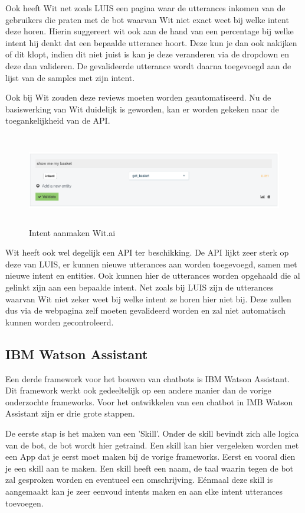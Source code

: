 Ook heeft Wit net zoals LUIS een pagina waar de utterances inkomen van de gebruikers die praten met de bot waarvan Wit niet exact weet bij welke intent deze horen. Hierin suggereert wit ook aan de hand van een percentage bij welke intent hij denkt dat een bepaalde utterance hoort. Deze kun je dan ook nakijken of dit klopt, indien dit niet juist is kan je deze veranderen via de dropdown en deze dan valideren. De gevalideerde utterance wordt daarna toegevoegd aan de lijst van de samples met zijn intent.

Ook bij Wit zouden deze reviews moeten worden geautomatiseerd. Nu de basiswerking van Wit duidelijk is geworden, kan er worden gekeken naar de toegankelijkheid van de API. 

\begin{figure}[h!]
	\centering
	\includegraphics[height=4cm]{img/inbox.png}
	\caption{Intent aanmaken Wit.ai}
	\label{fig:inbox}
\end{figure}

Wit heeft ook wel degelijk een API ter beschikking. De API lijkt zeer sterk op deze van LUIS, er kunnen nieuwe utterances aan worden toegevoegd, samen met nieuwe intent en entities. Ook kunnen hier de utterances worden opgehaald die al gelinkt zijn aan een bepaalde intent. Net zoals bij LUIS zijn de utterances waarvan Wit niet zeker weet bij welke intent ze horen hier niet bij. Deze zullen dus via de webpagina zelf moeten gevalideerd worden en zal niet automatisch kunnen worden gecontroleerd.

\subsection{IBM Watson Assistant}
\label{watson}

Een derde framework voor het bouwen van chatbots is IBM Watson Assistant. Dit framework werkt ook gedeeltelijk op een andere manier dan de vorige onderzochte frameworks. Voor het ontwikkelen van een chatbot in IMB Watson Assistant zijn er drie grote stappen.

De eerste stap is het maken van een 'Skill'. Onder de skill bevindt zich alle logica van de bot, de bot wordt hier getraind. Een skill kan hier vergeleken worden met een App dat je eerst moet maken bij de vorige frameworks. Eerst en vooral dien je een skill aan te maken. Een skill heeft een naam, de taal waarin tegen de bot zal gesproken worden en eventueel een omschrijving. Eénmaal  deze skill is aangemaakt kan je zeer eenvoud intents maken en aan elke intent utterances toevoegen.

